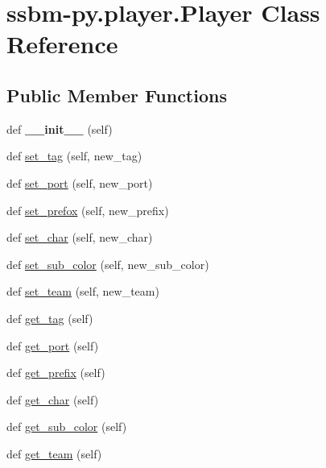 \hypertarget{classssbm-py_1_1player_1_1_player}{}\section{ssbm-\/py.player.\+Player Class Reference}
\label{classssbm-py_1_1player_1_1_player}
\subsection*{Public Member Functions}
\begin{DoxyCompactItemize}
\item 
\mbox{\label{classssbm-py_1_1player_1_1_player_aeb22f9b0e07e0dd274950ff502183570}} 
def {\bfseries \+\_\+\+\_\+init\+\_\+\+\_\+} (self)
\item 
def \hyperlink{classssbm-py_1_1player_1_1_player_ab108135e28b39fd47eb28b698d8e7dca}{set\+\_\+tag} (self, new\+\_\+tag)
\item 
def \hyperlink{classssbm-py_1_1player_1_1_player_a25b5683581a1137b24933f56ceb5a1e5}{set\+\_\+port} (self, new\+\_\+port)
\item 
def \hyperlink{classssbm-py_1_1player_1_1_player_a48cacf185c1cb9741d9b5bbd808df68c}{set\+\_\+prefox} (self, new\+\_\+prefix)
\item 
def \hyperlink{classssbm-py_1_1player_1_1_player_ae43cdb84af3cf17196da1d9f6cda1bbd}{set\+\_\+char} (self, new\+\_\+char)
\item 
def \hyperlink{classssbm-py_1_1player_1_1_player_a6489819d117a20bc66da65479679e931}{set\+\_\+sub\+\_\+color} (self, new\+\_\+sub\+\_\+color)
\item 
def \hyperlink{classssbm-py_1_1player_1_1_player_a76ee5811187bdd2bf707aefa7fe8289f}{set\+\_\+team} (self, new\+\_\+team)
\item 
def \hyperlink{classssbm-py_1_1player_1_1_player_a249df262cf377aa1a4ad4c1a28ed4c3c}{get\+\_\+tag} (self)
\item 
def \hyperlink{classssbm-py_1_1player_1_1_player_a5773bdb0017fdbf0f329f1186d6fc9d6}{get\+\_\+port} (self)
\item 
def \hyperlink{classssbm-py_1_1player_1_1_player_a34d3df779ec8c498c71a88f08a2e3d7d}{get\+\_\+prefix} (self)
\item 
def \hyperlink{classssbm-py_1_1player_1_1_player_a9642f6dbf8c2fbe2fcabdced55fe6913}{get\+\_\+char} (self)
\item 
def \hyperlink{classssbm-py_1_1player_1_1_player_ad0147eb4ccff73c6708a23a2f6a02be4}{get\+\_\+sub\+\_\+color} (self)
\item 
def \hyperlink{classssbm-py_1_1player_1_1_player_ac9d3031930eb64515b9e836eb785237a}{get\+\_\+team} (self)
\end{DoxyCompactItemize}


